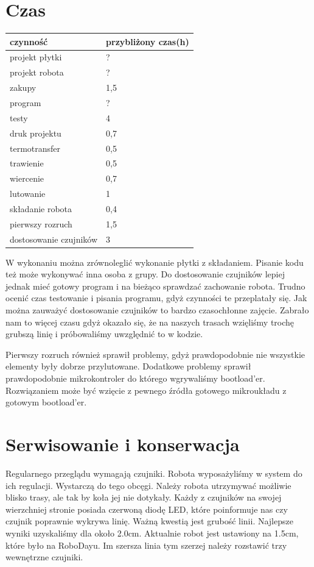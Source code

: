 \documentclass[a4paper,11pt]{article}
\begin{document}
\section{Czas}
\begin{center}


\begin{tabular}{|l|l|}
\hline
czynność				& przybliżony czas(h)		\\ \hline
projekt płytki			& ?							\\
projekt robota			& ?							\\
zakupy					& 1,5						\\
program					& ?							\\
testy					& 4							\\
druk projektu			& 0,7						\\
termotransfer			& 0,5						\\
trawienie				& 0,5						\\
wiercenie				& 0,7						\\
lutowanie				& 1							\\
składanie robota			& 0,4						\\
pierwszy rozruch			& 1,5						\\
dostosowanie czujników	& 3							\\

\hline
\end{tabular}
\end{center}
W wykonaniu można zrównoleglić  wykonanie płytki z składaniem. Pisanie kodu też może wykonywać inna osoba z grupy. Do dostosowanie czujników lepiej jednak mieć gotowy program i na bieżąco sprawdzać zachowanie robota.
Trudno ocenić czas testowanie i pisania programu, gdyż czynności te przeplatały się.
Jak można zauważyć dostosowanie czujników to bardzo czasochłonne zajęcie. Zabrało nam to więcej czasu gdyż okazało się, że na naszych trasach wzięliśmy trochę grubszą linię i próbowaliśmy uwzględnić to w kodzie.

Pierwszy rozruch również sprawił problemy, gdyż prawdopodobnie nie wszystkie elementy były dobrze przylutowane. Dodatkowe problemy sprawił prawdopodobnie mikrokontroler do którego wgrywaliśmy bootload'er. Rozwiązaniem może być wzięcie z pewnego źródła gotowego mikroukładu z gotowym bootload'er.
\section{Serwisowanie i konserwacja}
Regularnego przeglądu wymagają czujniki. Robota wyposażyliśmy w system do ich regulacji. Wystarczą do tego obcęgi. Należy robota utrzymywać możliwie blisko trasy, ale tak by koła jej nie dotykały. Każdy z czujników na swojej wierzchniej stronie posiada czerwoną diodę LED, które poinformuje nas czy czujnik poprawnie wykrywa linię. Ważną kwestią jest grubość linii. Najlepsze wyniki uzyskaliśmy dla około 2.0cm. Aktualnie robot jest ustawiony na 1.5cm, które było na RoboDayu. Im szersza linia tym szerzej należy rozstawić trzy wewnętrzne czujniki.
\end{document}
